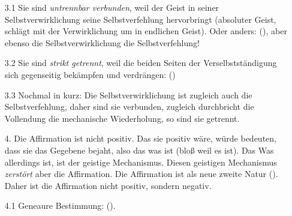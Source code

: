 \documentclass[12pt, a4paper, openany]{report}
\begin{document}
\begin{itemize}
    \item[3.1] Sie sind \emph{untrennbar verbunden}, weil der Geist in seiner Selbstverwirklichung seine Selbstverfehlung hervorbringt (absoluter Geist, schlägt mit der Verwirklichung um in endlichen Geist).
    Oder anders:  (\cite[][147]{menke_autonomie_2018}), aber ebenso die Selbstverwirklichung die Selbstverfehlung! 
    \item[3.2] Sie sind \emph{strikt getrennt}, weil die beiden Seiten der Verselbstständigung sich gegenseitig bekämpfen und verdrängen:  (\cite[][147]{menke_autonomie_2018}) 
    \item[3.3] Nochmal in kurz: Die Selbstverwirklichung ist zugleich auch die Selbstverfehlung, daher sind sie verbunden, zugleich durchbricht die Vollendung die mechanische Wiederholung, so sind sie getrennt.
    \item[4.] Die Affirmation ist nicht positiv. 
        Das sie positiv wäre, würde bedeuten, dass sie das Gegebene bejaht, also das was ist (bloß weil es ist). 
        Das Was allerdings ist, ist der geistige Mechanismus.
        Diesen geistigen Mechanismus \emph{zerstört} aber die Affirmation. 
        Die Affirmation ist als neue zweite Natur  (\cite[][148]{menke_autonomie_2018}).
        Daher ist die Affirmation nicht positiv, sondern negativ.
    \item[4.1] Geneaure Bestimmung:  (\cite[][148]{menke_autonomie_2018}).
\end{itemize}
\end{document}
